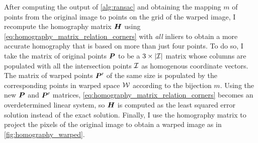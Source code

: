 \documentclass[../report.tex]{subfiles}
\begin{document}
After computing the output of \cref{alg:ransac} and obtaining the mapping $m$ of points from the original image to points on the grid of the warped image, I recompute the homography matrix ${\bm{H}}$ using \cref{eq:homography_matrix_relation_corners} with \emph{all} inliers to obtain a more accurate homography that is based on more than just four points.
To do so, I take the matrix of original points ${\bm{P}}$ to be a $3 \times \lvert{\mathcal{I}}\rvert$ matrix whose columns are populated with all the intersection points ${\mathcal{I}}$ as homogenous coordinate vectors.
The matrix of warped points ${\bm{P}}'$ of the same size is populated by the corresponding points in warped space ${\mathcal{W}}$ according to the bijection $m$.
Using the new ${\bm{P}}$ and ${\bm{P}}'$ matrices, \cref{eq:homography_matrix_relation_corners} becomes an overdetermined linear system, so ${\bm{H}}$ is computed as the least squared error solution instead of the exact solution.
Finally, I use the homography matrix to project the pixels of the original image to obtain a warped image as in \cref{fig:homography_warped}. 
\end{document}
